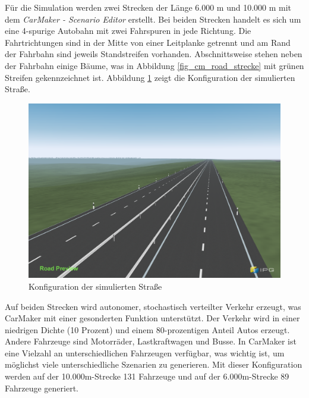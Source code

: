 Für die Simulation werden zwei Strecken der Länge 6.000 m und 10.000 m mit dem \textit{CarMaker - Scenario Editor} erstellt. Bei beiden Strecken handelt es sich um eine 4-spurige Autobahn mit zwei Fahrspuren in jede Richtung. Die Fahrtrichtungen sind in der Mitte von einer Leitplanke getrennt und am Rand der Fahrbahn sind jeweils Standstreifen vorhanden. Abschnittsweise stehen neben der Fahrbahn einige Bäume, was in Abbildung \ref{fig_cm_road_strecke} mit grünen Streifen gekennzeichnet ist. Abbildung \ref{fig_cm_road_bild} zeigt die Konfiguration der simulierten Straße.

\begin{figure}[h]
\centering
\includegraphics[scale=0.25]{images/cm_road_bild.png}
\caption[Konfiguration der simulierten Straße]{Konfiguration der simulierten Straße \cite{ipg2018carmaker}}
\label{fig_cm_road_bild}
\end{figure}

Auf beiden Strecken wird autonomer, stochastisch verteilter Verkehr erzeugt, was CarMaker mit einer gesonderten Funktion unterstützt. Der Verkehr wird in einer niedrigen Dichte (10 Prozent) und einem 80-prozentigen Anteil Autos erzeugt. Andere Fahrzeuge sind Motorräder, Lastkraftwagen und Busse. In CarMaker ist eine Vielzahl an unterschiedlichen Fahrzeugen verfügbar, was wichtig ist, um möglichst viele unterschiedliche Szenarien zu generieren. Mit dieser Konfiguration werden auf der 10.000m-Strecke 131 Fahrzeuge und auf der 6.000m-Strecke 89 Fahrzeuge generiert.

